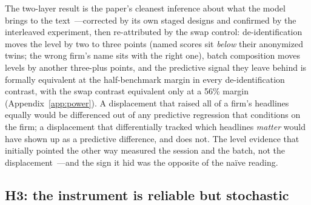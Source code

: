 The two-layer result is the paper's cleanest inference about what the model brings to the text~---corrected by its own staged designs and confirmed by the interleaved experiment, then re-attributed by the swap control: de-identification moves the level by two to three points (named scores sit \emph{below} their anonymized twins; the wrong firm's name sits with the right one), batch composition moves levels by another three-plus points, and the predictive signal they leave behind is formally equivalent at the half-benchmark margin in every de-identification contrast, with the swap contrast equivalent only at a 56\% margin (Appendix~\ref{app:power}). A displacement that raised all of a firm's headlines equally would be differenced out of any predictive regression that conditions on the firm; a displacement that differentially tracked which headlines \emph{matter} would have shown up as a predictive difference, and does not. The level evidence that initially pointed the other way measured the session and the batch, not the displacement~---and the sign it hid was the opposite of the naïve reading.

\subsection{H3: the instrument is reliable but stochastic}\label{sec:results:h3}

